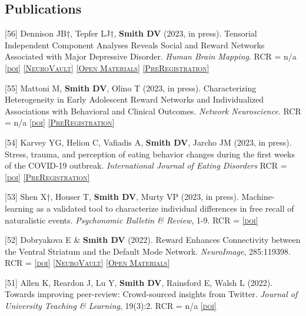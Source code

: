 \documentclass[11pt, letterpaper]{article}
\newcommand{\doi}[1]{\href{#1}{\scriptsize\textsc{[doi]}}} %
\newcommand{\neurovault}[1]{\href{#1}{\scriptsize\textsc{[NeuroVault]}}}
\newcommand{\materials}[1]{\href{#1}{\scriptsize\textsc{[Open Materials]}}}
\newcommand{\preregistration}[1]{\href{#1}{\scriptsize\textsc{[PreRegistration]}}}
\begin{document}
\subsection*{Publications}

\begin{hangparas}{.5in}{1}

[56] Dennison JB†, Tepfer LJ†, \textbf{Smith DV} (2023, in press). Tensorial Independent Component Analyses Reveals Social and Reward Networks Associated with Major Depressive Disorder. \textit{Human Brain Mapping}. RCR = n/a \doi{https://doi.org/10.1101/2022.08.04.502820} \neurovault{https://identifiers.org/neurovault.collection:13474} \materials{https://github.com/jbdenniso/CSNmaps} \preregistration{https://aspredicted.org/BIO_JHP} %

[55] Mattoni M, \textbf{Smith DV}, Olino T (2023, in press). Characterizing Heterogeneity in Early Adolescent Reward Networks and Individualized Associations with Behavioral and Clinical Outcomes. \textit{Network Neuroscience}. RCR = n/a \doi{https://doi.org/10.1162/netn_a_00306} \preregistration{https://osf.io/6n5j2}

[54] Karvey YG, Helion C, Vafiadis A, \textbf{Smith DV}, Jarcho JM (2023, in press). Stress, trauma, and perception of eating behavior changes during the first weeks of the COVID-19 outbreak. \textit{International Journal of Eating Disorders} RCR =  \doi{https://doi.org/10.1002/eat.23863} \preregistration{https://aspredicted.org/FTR_AIB}

[53] Shen X†, Houser T, \textbf{Smith DV}, Murty VP (2023, in press). Machine-learning as a validated tool to characterize individual differences in free recall of naturalistic events. \textit{Psychonomic Bulletin \& Review}, 1-9. RCR =  \doi{https://doi.org/10.3758/s13423-022-02171-4}

[52] Dobryakova E \& \textbf{Smith DV} (2022). Reward Enhances Connectivity between the Ventral Striatum and the Default Mode Network. \textit{NeuroImage}, 285:119398. RCR =  \doi{https://doi.org/10.1016/j.neuroimage.2022.119398} \neurovault{https://identifiers.org/neurovault.collection:10921} \materials{https://github.com/edobryakova/DobryakovaSmith_HCP}

[51] Allen K, Reardon J, Lu Y, \textbf{Smith DV}, Rainsford E, Walsh L (2022). Towards improving peer-review: Crowd-sourced insights from Twitter. \textit{Journal of University Teaching \& Learning}, 19(3):2. RCR = n/a \doi{https://ro.uow.edu.au/jutlp/vol19/iss3/02}


\end{hangparas}
\end{document}
